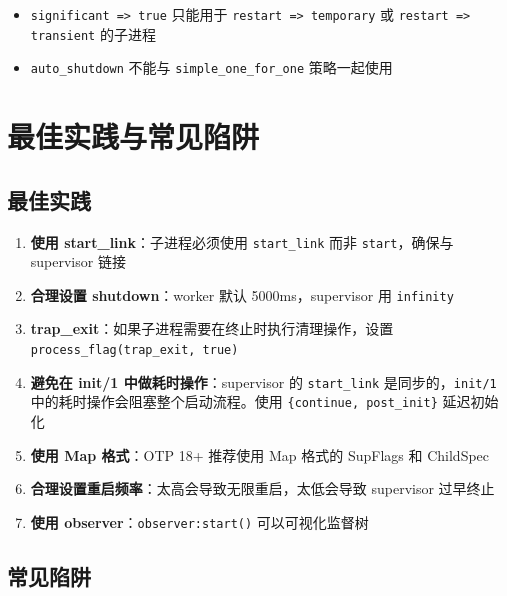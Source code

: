 \documentclass[a4paper,11pt]{article}
\begin{document}
\begin{notebox}[使用限制]
\begin{itemize}[leftmargin=1.5em]
    \item \texttt{significant => true} 只能用于 \texttt{restart => temporary} 或 \texttt{restart => transient} 的子进程
    \item \texttt{auto\_shutdown} 不能与 \texttt{simple\_one\_for\_one} 策略一起使用
\end{itemize}
\end{notebox}


\section{最佳实践与常见陷阱}

\subsection{最佳实践}

\begin{enumerate}[leftmargin=2em]
    \item \textbf{使用 start\_link}：子进程必须使用 \texttt{start\_link} 而非 \texttt{start}，确保与 supervisor 链接
    \item \textbf{合理设置 shutdown}：worker 默认 5000ms，supervisor 用 \texttt{infinity}
    \item \textbf{trap\_exit}：如果子进程需要在终止时执行清理操作，设置 \texttt{process\_flag(trap\_exit, true)}
    \item \textbf{避免在 init/1 中做耗时操作}：supervisor 的 \texttt{start\_link} 是同步的，\texttt{init/1} 中的耗时操作会阻塞整个启动流程。使用 \texttt{\{continue, post\_init\}} 延迟初始化
    \item \textbf{使用 Map 格式}：OTP 18+ 推荐使用 Map 格式的 SupFlags 和 ChildSpec
    \item \textbf{合理设置重启频率}：太高会导致无限重启，太低会导致 supervisor 过早终止
    \item \textbf{使用 observer}：\texttt{observer:start()} 可以可视化监督树
\end{enumerate}

\subsection{常见陷阱}
\end{document}
